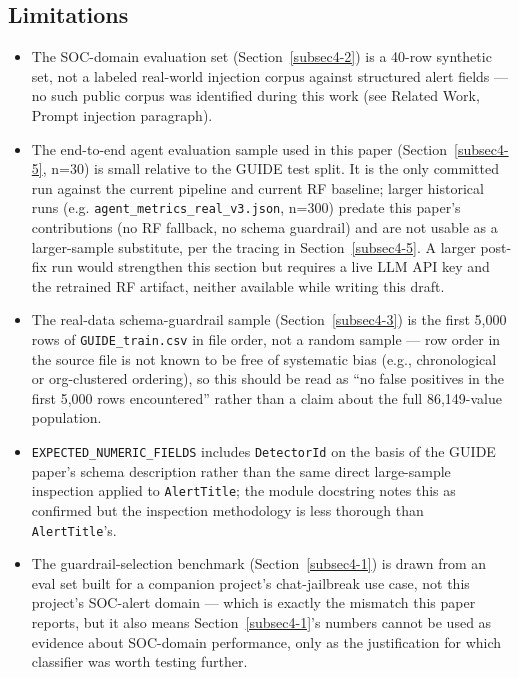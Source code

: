 \documentclass[twocolumn]{svjour3}
\begin{document}
\subsection*{Limitations}
\begin{itemize}
\item The SOC-domain evaluation set (Section~\ref{subsec4-2}) is a 40-row synthetic set, not a labeled real-world injection corpus against structured alert fields --- no such public corpus was identified during this work (see Related Work, Prompt injection paragraph).
\item The end-to-end agent evaluation sample used in this paper (Section~\ref{subsec4-5}, n=30) is small relative to the GUIDE test split. It is the only committed run against the current pipeline and current RF baseline; larger historical runs (e.g. \texttt{agent\_metrics\_real\_v3.json}, n=300) predate this paper's contributions (no RF fallback, no schema guardrail) and are not usable as a larger-sample substitute, per the tracing in Section~\ref{subsec4-5}. A larger post-fix run would strengthen this section but requires a live LLM API key and the retrained RF artifact, neither available while writing this draft.
\item The real-data schema-guardrail sample (Section~\ref{subsec4-3}) is the first 5{,}000 rows of \texttt{GUIDE\_train.csv} in file order, not a random sample --- row order in the source file is not known to be free of systematic bias (e.g., chronological or org-clustered ordering), so this should be read as ``no false positives in the first 5{,}000 rows encountered'' rather than a claim about the full 86{,}149-value population.
\item \texttt{EXPECTED\_NUMERIC\_FIELDS} includes \texttt{DetectorId} on the basis of the GUIDE paper's schema description rather than the same direct large-sample inspection applied to \texttt{AlertTitle}; the module docstring notes this as confirmed but the inspection methodology is less thorough than \texttt{AlertTitle}'s.
\item The guardrail-selection benchmark (Section~\ref{subsec4-1}) is drawn from an eval set built for a companion project's chat-jailbreak use case, not this project's SOC-alert domain --- which is exactly the mismatch this paper reports, but it also means Section~\ref{subsec4-1}'s numbers cannot be used as evidence about SOC-domain performance, only as the justification for which classifier was worth testing further.
\end{itemize}
\end{document}
